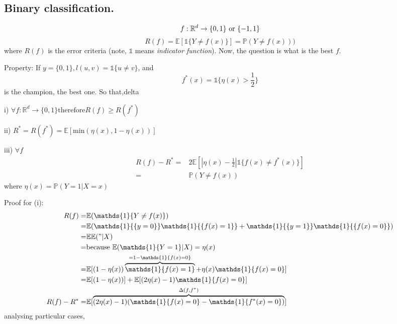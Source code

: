 		\subsection{Binary classification.}
  			\[
				\mathnormal{f}:\mathbb{R}^d\rightarrow\{0,1\} \mbox{ or } \{-1,1\}
  			\]
  			\[
			    R(f)=\mathbb{E}[\mathds{1}\{Y\neq f(x)\}]=\mathbb{P}(Y\neq f(x))) 
  			\]
			where $R(f)$ is the error criteria (note, $\mathds{1}$ means \emph{indicator function}).
  			Now, the question is what is the best $f$.
	
			Property: If $y=\{0,1\}, l(u,v)=\mathds{1}\{u\neq v\}$, and
  			\[
			    f^*(x)=\mathds{1}\{\eta(x)>\frac{1}{2}\} 
  			\]
			is the champion, the best one. So that,delta

	      i) $\forall f : \mathds{R}^d \rightarrow \{0,1\} \text{therefore} R(f) \geq R(f^{*})$						

	     ii) $R^* = R(f^*) = \mathbb{E}[\text{min}(\eta(x),1-\eta(x))]$						

	     iii) $\forall f$						
        \begin{align*}
            R(f)-R^* = & 2\mathbb{E}[|\eta(x)-\frac{1}{2}|\mathds{1}\{f(x)\neq f^*(x)\}] \\
                           = & \mathbb{P}(Y\neq f(x))
        \end{align*}
	     where $\eta(x)=\mathbb{P}(Y=1|X=x)$

	     Proof for (i):
        \begin{align*}
            R(f) = &  \mathbb{E}(\mathds{1}\{Y\neq f(x)\}) \\
                   = &  \mathbb{E}(\mathds{1}{\{y=0\}}\mathds{1}{\{f(x)=1\}}+\mathds{1}{\{y=1\}}\mathds{1}{\{f(x)=0\}})\\
                   = &  \mathbb{E}\mathbb{E}( " | X)\\
                   = &  \text{because } \mathbb{E}(\mathds{1}\{Y=1\}|X)=\eta(x)\\
                   = &  \mathbb{E}[(1-\eta(x)) \overbrace{\mathds{1}\{f(x)=1\}}^{=1-\mathds{1}\{f(x)=0\}}+\eta(x)\mathds{1}\{f(x)=0\}]\\
                   = &  \mathbb{E}[(1-\eta(x))] + \mathbb{E}[(2\eta(x)-1)\mathds{1}\{f(x)=0\}]\\
                   R(f) -R^* = &  \mathbb{E}[\overbrace{(2\eta(x)-1)(\mathds{1}\{f(x)=0\}-\mathds{1}\{f^*(x)=0\})}^{\Delta (f,f^*)}]
        \end{align*}
        analysing particular cases,

